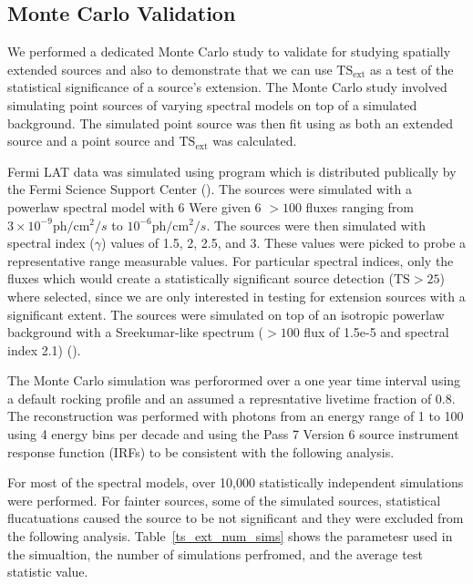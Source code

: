 \documentclass[preprint]{aastex}
\newcommand{\mev}{\text{MeV}\xspace}
\newcommand{\gev}{\text{GeV}\xspace}
\newcommand{\ph}{\text{ph}\xspace}
\newcommand{\cm}{\text{cm}\xspace}
\newcommand{\tsext}{{\ensuremath{\text{TS}_\text{ext}}}\xspace}
\newcommand{\ts}{\text{TS}\xspace}
\newcommand{\pointlike}{\text{\em pointlike}\xspace}
\newcommand{\gtobssim}{\text{\em gtobssim}\xspace}
\begin{document}
\subsection{Monte Carlo Validation} \label{monte_carlo_validation}

We performed a dedicated Monte Carlo study to validate \pointlike for
studying spatially extended sources and also to demonstrate that we can
use $\tsext$ as a test of the statistical significance
of a source's extension.  The Monte Carlo study involved simulating point
sources of varying spectral models on top of a simulated background. The
simulated point source was then fit using \pointlike as both an extended
source and a point source and $\tsext$ was calculated.

Fermi LAT data was simulated using program \gtobssim which is
distributed publically by the Fermi Science Support Center
(\cite{fssc}).  The sources were simulated with a powerlaw spectral
model with 6 Were given 6 $>100$ \mev fluxes ranging from $3\times 10^{-9}
\ph/\cm^2/s$ to $10^{-6} \ph/\cm^2/s$.  The sources were then simulated
with spectral index ($\gamma$) values of 1.5, 2, 2.5, and 3.  These
values were picked to probe a representative range measurable values.
For particular spectral indices, only the fluxes which would create a
statistically significant source detection ($\ts>25$) where selected,
since we are only interested in testing for extension sources with a
significant extent. The sources were simulated on top of an isotropic
powerlaw background with a Sreekumar-like spectrum ($>100$ \mev flux
of 1.5e-5 and spectral index 2.1) (\cite{sreekumar_isotropic}).

The Monte Carlo simulation was perforormed over a one year time interval using
a default rocking profile and an assumed a represntative
livetime fraction of 0.8.
The reconstruction was performed with photons from an energy range of
1 \gev to 100 \gev using 4 energy bins per decade and using the Pass 7 Version 6
source instrument response function (IRFs) to be consistent with the following analysis.

For most of the spectral models, over 10,000 statistically independent simulations were performed.
For fainter sources, some of the simulated sources, statistical flucatuations
caused the source to be not significant and they were excluded from the following analysis.
Table~\ref{ts_ext_num_sims} shows the parametesr used in the simualtion,
the number of simulations perfromed, and the average test statistic value.
\end{document}
